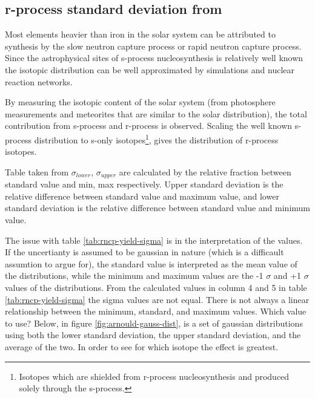 
\subsection{r-process standard deviation from \cite{arnould07}}
Most elements heavier than iron in the solar system can be attributed to synthesis by the slow neutron capture process or rapid neutron capture process. Since the astrophysical sites of s-process nucleosynthesis is relatively well known the isotopic distribution can be well approximated by simulations and nuclear reaction networks.

By measuring the isotopic content of the solar system (from photosphere measurements and meteorites that are similar to the solar distribution), the total contribution from s-process and r-process is observed. Scaling the well known s-process distribution to s-only isotopes\footnote{Isotopes which are shielded from r-process nucleosynthesis and produced solely through the s-process.}, gives the distribution of r-process isotopes.

\begin{table}
  
  \caption{\label{tab:rncp-yield-sigma}
    Table taken from \cite[table 1]{arnould07}
    $\sigma_{lower}$, $\sigma_{upper}$ are calculated by the relative fraction between standard value and min, max respectively.
    Upper standard deviation is the relative difference between standard value and maximum value, and lower standard deviation is the relative difference between standard value and minimum value.
  }
\end{table}
\FloatBarrier

The issue with table \ref{tab:rncp-yield-sigma} is in the interpretation of the values. If the uncertianty is assumed to be gaussian in nature (which is a difficault assumtion to argue for), the standard value is interpreted as the mean value of the distributions, while the minimum and maximum values are the -1 $\sigma$ and +1 $\sigma$ values of the distributions. From the calculated values in column 4 and 5 in table \ref{tab:rncp-yield-sigma} the sigma values are not equal. There is not always a linear relationship between the minimum, standard, and maximum values.
Which value to use? Below, in figure \ref{fig:arnould-gauss-dist}, is a set of gaussian distributions using both  the lower standard deviation, the upper standard deviation, and the average of the two.
In order to see for which isotope the effect is greatest.

